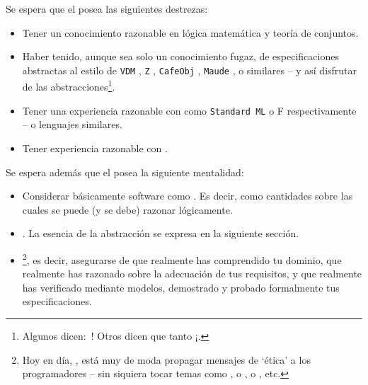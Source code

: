\begynd
\pind Se espera que el  posea las
      siguientes destrezas:
\afslut
\begin{itemize}
\item Tener un conocimiento razonable en  lógica matemática
  y teoría de conjuntos.
\item Haber tenido, aunque sea solo un conocimiento fugaz, de especificaciones abstractas al estilo de
  \texttt{VDM} \citevdm,
  \texttt{Z} \citez,
  \texttt{CafeObj} \citecafeobj, 
  \texttt{Maude} \cite{maude-primer,maude-manual}, o similares -- y así
  disfrutar de las abstracciones\footnote{Algunos dicen: \,! Otros dicen que tanto ¡.}.
\item Tener una experiencia razonable con  como \texttt{Standard ML} o \textsf{F}
      \cite{MilnerTofte,Harper,MRHansen+HRischel} respectivamente
      \cite{Hansen+Rischel} -- o lenguajes similares.
    \item Tener experiencia razonable con 
      \cite{Hoa78,Hoare85,Hoare85+2004,Roscoe97,Schneider99}.
\end{itemize}
\noindent
\begynd
\pind Se espera además que el  posea
      la siguiente mentalidad:
\afslut
\begin{itemize}
\item Considerar básicamente software como . Es decir, como cantidades sobre las cuales se puede (y se debe) razonar lógicamente.
  \item {}. La esencia de
  la abstracción se expresa en la siguiente sección.

\item {}\footnote{Hoy en día, \todaytime, 
    está muy de moda propagar mensajes de `ética' a los programadores
    -- sin siquiera tocar temas como , o
    ,
    o , etc.}, es decir, asegurarse de que 
    realmente has comprendido tu dominio, que realmente has razonado
    sobre la adecuación de tus requisitos, y que realmente has
    verificado mediante modelos, demostrado y probado formalmente tus
    especificaciones.
\end{itemize}
\label{primer:Abstraction}


